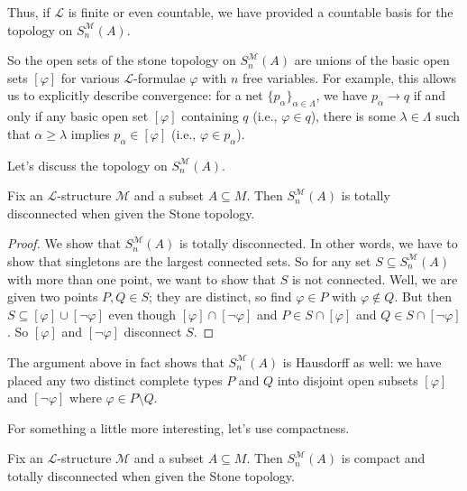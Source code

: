 \documentclass[../notes.tex]{subfiles}
\begin{document}
\begin{remark}
	Thus, if $\mathcal L$ is finite or even countable, we have provided a countable basis for the topology on $S_n^{\mathcal M}(A)$.
\end{remark}
So the open sets of the stone topology on $S_n^{\mathcal M}(A)$ are unions of the basic open sets $[\varphi]$ for various $\mathcal L$-formulae $\varphi$ with $n$ free variables. For example, this allows us to explicitly describe convergence: for a net $\{p_\alpha\}_{\alpha\in\Lambda}$, we have $p_\alpha\to q$ if and only if any basic open set $[\varphi]$ containing $q$ (i.e., $\varphi\in q$), there is some $\lambda\in\Lambda$ such that $\alpha\ge\lambda$ implies $p_\alpha\in[\varphi]$ (i.e., $\varphi\in p_\alpha$).

Let's discuss the topology on $S_n^{\mathcal M}(A)$.
\begin{proposition}
	Fix an $\mathcal L$-structure $\mathcal M$ and a subset $A\subseteq M$. Then $S_n^{\mathcal M}(A)$ is totally disconnected when given the Stone topology.
\end{proposition}
\begin{proof}
	We show that $S_n^{\mathcal M}(A)$ is totally disconnected. In other words, we have to show that singletons are the largest connected sets. So for any set $S\subseteq S_n^{\mathcal M}(A)$ with more than one point, we want to show that $S$ is not connected. Well, we are given two points $P,Q\in S$; they are distinct, so find $\varphi\in P$ with $\varphi\notin Q$. But then $S\subseteq[\varphi]\cup[\lnot\varphi]$ even though $[\varphi]\cap[\lnot\varphi]$ and $P\in S\cap[\varphi]$ and $Q\in S\cap[\lnot\varphi]$. So $[\varphi]$ and $[\lnot\varphi]$ disconnect $S$.
\end{proof}
\begin{remark}
	The argument above in fact shows that $S_n^{\mathcal M}(A)$ is Hausdorff as well: we have placed any two distinct complete types $P$ and $Q$ into disjoint open subsets $[\varphi]$ and $[\lnot\varphi]$ where $\varphi\in P\setminus Q$.
\end{remark}
For something a little more interesting, let's use compactness.
\begin{theorem}
	Fix an $\mathcal L$-structure $\mathcal M$ and a subset $A\subseteq M$. Then $S_n^{\mathcal M}(A)$ is compact and totally disconnected when given the Stone topology.
\end{theorem}
\end{document}
